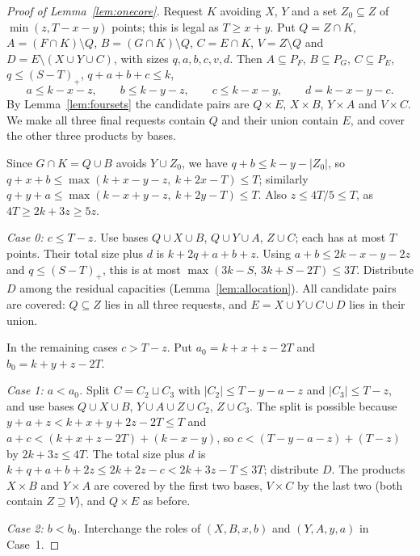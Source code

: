 \documentclass[11pt]{article}
\numberwithin{equation}{section}
\theoremstyle{definition}
\theoremstyle{remark}
\begin{document}
\begin{proof}[Proof of Lemma~\ref{lem:onecore}]
Request $K$ avoiding $X$, $Y$ and a set $Z_0\subseteq Z$ of
$\min(z,T-x-y)$ points; this is legal as $T\ge x+y$. Put
$Q=Z\cap K$, $A=(F\cap K)\setminus Q$, $B=(G\cap K)\setminus Q$,
$C=E\cap K$, $V=Z\setminus Q$ and $D=E\setminus(X\cup Y\cup C)$, with
sizes $q,a,b,c,v,d$. Then $A\subseteq P_F$, $B\subseteq P_G$,
$C\subseteq P_E$, $q\le(S-T)_+$, $q+a+b+c\le k$,
\[
 a\le k-x-z,\qquad b\le k-y-z,\qquad c\le k-x-y,\qquad d=k-x-y-c .
\]
By Lemma~\ref{lem:foursets} the candidate pairs are $Q\times E$,
$X\times B$, $Y\times A$ and $V\times C$. We make all three final
requests contain $Q$ and their union contain $E$, and cover the other
three products by bases.

Since $G\cap K=Q\cup B$ avoids $Y\cup Z_0$, we have $q+b\le k-y-|Z_0|$, so
$q+x+b\le\max(k+x-y-z,\ k+2x-T)\le T$; similarly
$q+y+a\le\max(k-x+y-z,\ k+2y-T)\le T$. Also $z\le4T/5\le T$, as
$4T\ge2k+3z\ge5z$.

\emph{Case 0: $c\le T-z$.} Use bases $Q\cup X\cup B$, $Q\cup Y\cup A$,
$Z\cup C$; each has at most $T$ points. Their total size plus $d$ is
$k+2q+a+b+z$. Using $a+b\le2k-x-y-2z$ and $q\le(S-T)_+$, this is at most
$\max(3k-S,\,3k+S-2T)\le3T$. Distribute $D$ among the residual
capacities (Lemma~\ref{lem:allocation}). All candidate pairs are
covered: $Q\subseteq Z$ lies in all three requests, and
$E=X\cup Y\cup C\cup D$ lies in their union.

In the remaining cases $c>T-z$. Put $a_0=k+x+z-2T$ and $b_0=k+y+z-2T$.

\emph{Case 1: $a<a_0$.} Split $C=C_2\sqcup C_3$ with $|C_2|\le T-y-a-z$ and
$|C_3|\le T-z$, and use bases
$Q\cup X\cup B$, $Y\cup A\cup Z\cup C_2$, $Z\cup C_3$. The split is
possible because $y+a+z<k+x+y+2z-2T\le T$ and
$a+c<(k+x+z-2T)+(k-x-y)$, so $c<(T-y-a-z)+(T-z)$ by $2k+3z\le4T$. The
total size plus $d$ is $k+q+a+b+2z\le2k+2z-c<2k+3z-T\le3T$; distribute
$D$. The products $X\times B$ and $Y\times A$ are covered by the first
two bases, $V\times C$ by the last two (both contain $Z\supseteq V$),
and $Q\times E$ as before.

\emph{Case 2: $b<b_0$.} Interchange the roles of $(X,B,x,b)$ and
$(Y,A,y,a)$ in Case~1.


\end{proof}
\end{document}
